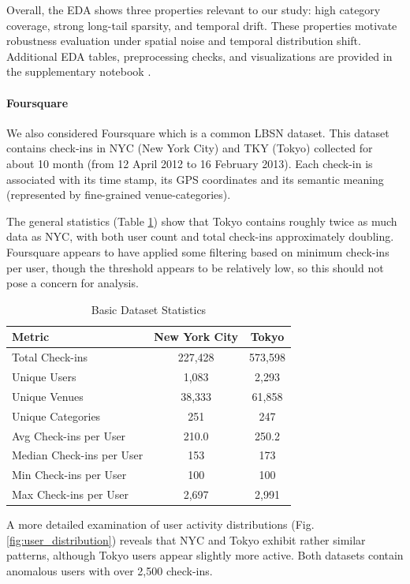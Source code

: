 \documentclass[12pt, journal]{IEEEtran}
\begin{document}
Overall, the EDA shows three properties relevant to our study: high category coverage, strong long-tail sparsity, and temporal drift. These properties motivate robustness evaluation under spatial noise and temporal distribution shift. Additional EDA tables, preprocessing checks, and visualizations are provided in the supplementary notebook \cite{gowalla_eda_notebook}.

\paragraph{Foursquare}

We also considered Foursquare \cite{yang2015modeling} which is a common LBSN dataset. This dataset contains check-ins in NYC (New York City) and TKY (Tokyo) collected for about 10 month (from 12 April 2012 to 16 February 2013). Each check-in is associated with its time stamp, its GPS coordinates and its semantic meaning (represented by fine-grained venue-categories).

The general statistics (Table \ref{tab:basic_stats}) show that Tokyo contains roughly twice as much data as NYC, with both user count and total check-ins approximately doubling. Foursquare appears to have applied some filtering based on minimum check-ins per user, though the threshold appears to be relatively low, so this should not pose a concern for analysis.

\begin{table}[!t]
\centering
\caption{Basic Dataset Statistics}
\label{tab:basic_stats}
\begin{tabular}{lcc}
\toprule
\textbf{Metric} & \textbf{New York City} & \textbf{Tokyo} \\
\midrule
Total Check-ins & 227,428 & 573,598 \\
Unique Users & 1,083 & 2,293 \\
Unique Venues & 38,333 & 61,858 \\
Unique Categories & 251 & 247 \\
Avg Check-ins per User & 210.0 & 250.2 \\
Median Check-ins per User & 153 & 173 \\
Min Check-ins per User & 100 & 100 \\
Max Check-ins per User & 2,697 & 2,991 \\
\bottomrule
\end{tabular}
\end{table}

A more detailed examination of user activity distributions (Fig. \ref{fig:user_distribution}) reveals that NYC and Tokyo exhibit rather similar patterns, although Tokyo users appear slightly more active. Both datasets contain anomalous users with over 2,500 check-ins.
\end{document}
